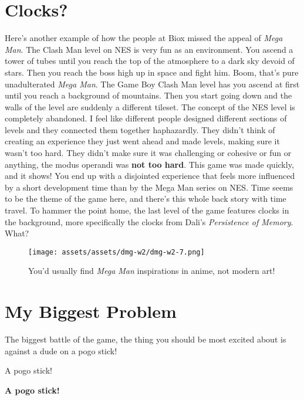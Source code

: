 \documentclass{book}
\begin{document}
\FloatBarrier\needspace{10mm}\section*{Clocks?}\nopagebreak[4]

Here’s another example of how the people at Biox missed the appeal of \emph{Mega Man}. The Clash Man level on NES is very fun as an environment. You ascend a tower of tubes until you reach the top of the atmosphere to a dark sky devoid of stars. Then you reach the boss high up in space and fight him. Boom, that’s pure unadulterated \emph{Mega Man}. The Game Boy Clash Man level has you ascend at first until you reach a background of mountains. Then you start going down and the walls of the level are suddenly a different tileset. The concept of the NES level is completely abandoned. I feel like different people designed different sections of levels and they connected them together haphazardly. They didn’t think of creating an experience they just went ahead and made levels, making sure it wasn’t too hard. They didn’t make sure it was challenging or cohesive or fun or anything, the modus operandi was \textbf{not too hard}. This game was made quickly, and it shows! You end up with a disjointed experience that feels more influenced by a short development time than by the Mega Man series on NES. Time seems to be the theme of the game here, and there’s this whole back story with time travel. To hammer the point home, the last level of the game features clocks in the background, more specifically the clocks from Dali’s \emph{Persistence of Memory}. What?

\begin{figure}[hbt]
\vskip 10pt
\centering \texttt{[image: assets/assets/dmg-w2/dmg-w2-7.png]}\par\pagetwodescription You’d usually find \emph{Mega Man} inspirations in anime, not modern art!
\vskip 6pt
\end{figure}

\FloatBarrier\needspace{10mm}\section*{My Biggest Problem}\nopagebreak[4]

The biggest battle of the game, the thing you should be most excited about is against a dude on a pogo stick!

A pogo stick!

\textbf{A pogo stick!}
\end{document}
